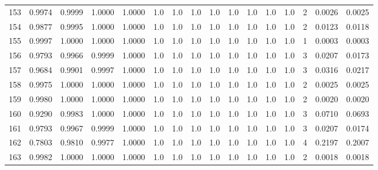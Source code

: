 \begin{tabular}{lrrrrrrrrrrrrrrr}
153 &      0.9974 &  0.9999 &  1.0000 &  1.0000 &     1.0 &     1.0 &     1.0 &     1.0 &     1.0 &     1.0 &      1.0 &        1.0 &      2 &                    0.0026 &                     0.0025 \\
154 &      0.9877 &  0.9995 &  1.0000 &  1.0000 &     1.0 &     1.0 &     1.0 &     1.0 &     1.0 &     1.0 &      1.0 &        1.0 &      2 &                    0.0123 &                     0.0118 \\
155 &      0.9997 &  1.0000 &  1.0000 &  1.0000 &     1.0 &     1.0 &     1.0 &     1.0 &     1.0 &     1.0 &      1.0 &        1.0 &      1 &                    0.0003 &                     0.0003 \\
156 &      0.9793 &  0.9966 &  0.9999 &  1.0000 &     1.0 &     1.0 &     1.0 &     1.0 &     1.0 &     1.0 &      1.0 &        1.0 &      3 &                    0.0207 &                     0.0173 \\
157 &      0.9684 &  0.9901 &  0.9997 &  1.0000 &     1.0 &     1.0 &     1.0 &     1.0 &     1.0 &     1.0 &      1.0 &        1.0 &      3 &                    0.0316 &                     0.0217 \\
158 &      0.9975 &  1.0000 &  1.0000 &  1.0000 &     1.0 &     1.0 &     1.0 &     1.0 &     1.0 &     1.0 &      1.0 &        1.0 &      2 &                    0.0025 &                     0.0025 \\
159 &      0.9980 &  1.0000 &  1.0000 &  1.0000 &     1.0 &     1.0 &     1.0 &     1.0 &     1.0 &     1.0 &      1.0 &        1.0 &      2 &                    0.0020 &                     0.0020 \\
160 &      0.9290 &  0.9983 &  1.0000 &  1.0000 &     1.0 &     1.0 &     1.0 &     1.0 &     1.0 &     1.0 &      1.0 &        1.0 &      3 &                    0.0710 &                     0.0693 \\
161 &      0.9793 &  0.9967 &  0.9999 &  1.0000 &     1.0 &     1.0 &     1.0 &     1.0 &     1.0 &     1.0 &      1.0 &        1.0 &      3 &                    0.0207 &                     0.0174 \\
162 &      0.7803 &  0.9810 &  0.9977 &  1.0000 &     1.0 &     1.0 &     1.0 &     1.0 &     1.0 &     1.0 &      1.0 &        1.0 &      4 &                    0.2197 &                     0.2007 \\
163 &      0.9982 &  1.0000 &  1.0000 &  1.0000 &     1.0 &     1.0 &     1.0 &     1.0 &     1.0 &     1.0 &      1.0 &        1.0 &      2 &                    0.0018 &                     0.0018 \\

\end{tabular}
